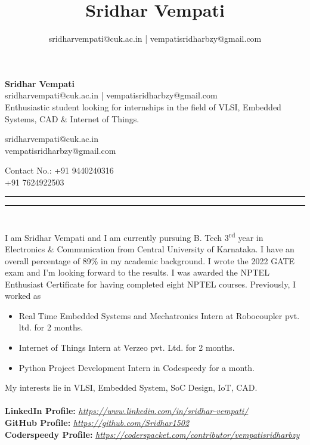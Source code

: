 \documentclass[]{article}
\title{Sridhar Vempati}
\author{sridharvempati@cuk.ac.in | vempatisridharbzy@gmail.com}
\begin{document}
    \begin{center}
        \Huge \textbf{Sridhar Vempati}\\
        \large sridharvempati@cuk.ac.in | vempatisridharbzy@gmail.com\\ 
	   \large Enthusiastic student looking for internships in the field of VLSI, Embedded Systems, CAD \& Internet of Things.
    \end{center}

    \begin{multicols}{2}[]
      \begin{flushleft}
	 sridharvempati@cuk.ac.in \\ vempatisridharbzy@gmail.com
      \end{flushleft}
      \begin{flushright}
	Contact No.: +91 9440240316\\
	+91 7624922503
        \end{flushright}
    \end{multicols}  
    
    \begin{spacing}{0.05} %
    \noindent
    \rule{\linewidth}{2pt}
    \rule{\linewidth}{1pt}  
    \end{spacing}

\section*{\color{blue}{Summary}}%
    I am Sridhar Vempati and I am currently pursuing B. Tech 3\textsuperscript{rd} year in Electronics \& Communication from Central University of Karnataka. I have an overall percentage of 89\% in my academic background. I wrote the 2022 GATE exam and I'm looking forward to the results. I was awarded the NPTEL Enthusiast Certificate for having completed eight NPTEL courses. Previously, I worked as
	\begin{itemize}
		\item Real Time Embedded Systems and Mechatronics Intern at Robocoupler pvt. ltd. for 2 months.
		\item Internet of Things Intern at Verzeo pvt. Ltd. for 2 months.
		\item Python Project Development Intern in Codespeedy for a month.
	\end{itemize}
    My interests lie in VLSI, Embedded System, SoC Design, IoT, CAD.\\ \\
     \textbf{LinkedIn Profile: }{\em \url{https://www.linkedin.com/in/sridhar-vempati/}}\\
     \textbf{GitHub Profile: }{\em \url{https://github.com/Sridhar1502}}\\
	\textbf{Coderspeedy Profile: }{\em \url{https://coderspacket.com/contributor/vempatisridharbzy}}
\end{document}
